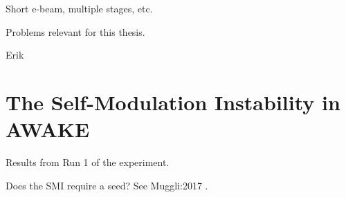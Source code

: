 Short e-beam, multiple stages, etc.

Problems relevant for this thesis.

Erik \cite{adli:2016a}

\section{The Self-Modulation Instability in AWAKE}
\label{WFA:SMI}

Results from Run 1 of the experiment.


Does the SMI require a seed? See Muggli:2017 \cite{muggli:2017a}.


